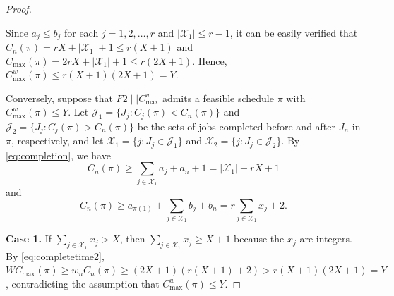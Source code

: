 \documentclass[12pt]{article} \textheight=24.5cm \textwidth=16.5cm \parskip = 0.165cm
\renewcommand{\thefigure}{\arabic{figure}}
\begin{document}
\begin{sloppypar}
\begin{proof}
\begin{figure}[H]
                \label{fig:nphard-partition}
            \end{figure}
            
            Since $a_j \leq b_j$ for each $j=1, 2, \ldots, r$ and $|\mathcal{X}_1| \leq r-1$, it can be easily verified that $C_n(\pi)=rX +|\mathcal{X}_1|+1 \leq r(X+1)$ and $C_{\max}(\pi)=2rX+|\mathcal{X}_1|+1 \leq r(2X+1)$.
            Hence, $C_{\max}^w(\pi) \leq r(X+1)(2X+1)= Y$.
            
            Conversely, suppose that $F2 \mid \mid C_{\max}^w$ admits a feasible schedule $\pi$ with $C_{\max}^w(\pi) \leq Y$.
            Let $\mathcal{J}_1=\{J_j: C_j(\pi) <C_n(\pi)\}$ and $\mathcal{J}_2=\{J_j: C_j(\pi) > C_n(\pi)\}$ be the sets of jobs completed before and after $J_n$ in $\pi$, respectively, and let $\mathcal{X}_1=\{j: J_j \in \mathcal{J}_1\}$ and $\mathcal{X}_2=\{j: J_j \in \mathcal{J}_2\}$.
            By \cref{eq:completion}, we have
            \begin{equation}\label{eq:completetime1}
                C_n(\pi) \geq \sum_{j \in \mathcal{X}_1} a_j +a_n+ 1=|\mathcal{X}_1| +r X + 1
            \end{equation}
            and
            \begin{equation}\label{eq:completetime2}
                C_n(\pi) \geq a_{\pi(1)}+\sum_{j \in \mathcal{X}_1} b_j+b_n = r \sum_{j \in \mathcal{X}_1} x_j + 2.
            \end{equation}
            
            \textbf{Case 1.} If $\sum_{j \in \mathcal{X}_1} x_j > X$, then $\sum_{j \in \mathcal{X}_1} x_j \geq X+1$ because the $x_j$ are integers.
            By \cref{eq:completetime2}, $W C_{\max}(\pi) \geq w_n C_n(\pi) \geq (2X+1) (r(X+1)+2) >r(X+1)(2X+1)=Y$, contradicting the assumption that $C_{\max}^w(\pi) \leq Y$.
            

\end{proof}
\end{sloppypar}
\end{document}
